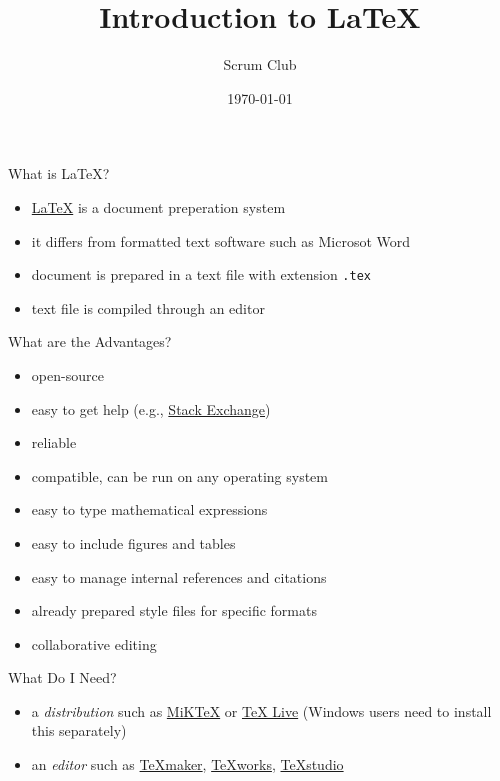 \documentclass[t,12pt]{beamer}
\title{Introduction to \LaTeX}
\date{\today}
\author{Scrum Club}
\begin{document}
\maketitle


\begin{frame}{What is \LaTeX?}

\begin{itemize}
\item{\href{https://www.latex-project.org//}{\LaTeX} is a document preperation system}
\item{it differs from formatted text software such as Microsot Word}
\item{document is prepared in a text file with extension \texttt{.tex}}
\item{text file is compiled through an editor}
\end{itemize}

\end{frame}


\begin{frame}{What are the Advantages?}

\begin{itemize}
\item{open-source}
\item{easy to get help (e.g., \href{https://tex.stackexchange.com/}{Stack Exchange})}
\item{reliable}
\item{compatible, can be run on any operating system}
\item{easy to type mathematical expressions}
\item{easy to include figures and tables}
\item{easy to manage internal references and citations}
\item{already prepared style files for specific formats}
\item{collaborative editing}
\end{itemize}

\end{frame}


\begin{frame}{What Do I Need?}

\begin{itemize}
\item{a \textit{distribution} such as \href{https://miktex.org/}{MiKTeX} or \href{https://www.tug.org/texlive/}{TeX Live} (Windows users need to install this separately)}
\item{an \textit{editor} such as \href{http://www.xm1math.net/texmaker/}{TeXmaker}, \href{https://www.tug.org/texworks/}{TeXworks}, \href{https://www.texstudio.org/}{TeXstudio}}
\end{itemize}

\end{frame}

\end{document}
